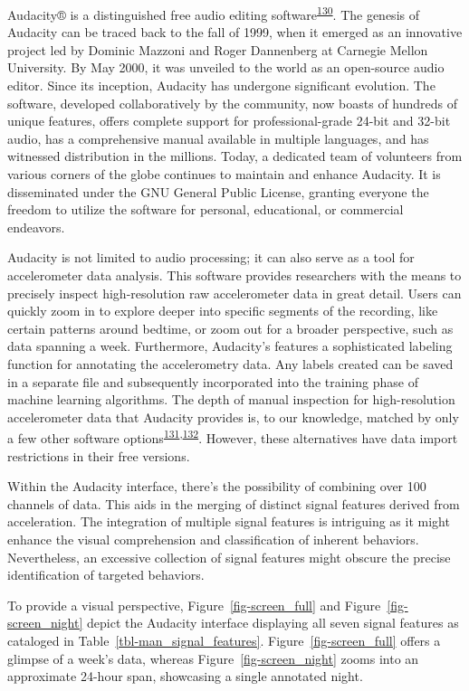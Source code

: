 \documentclass[
  10pt,
]{scrbook}
\begin{document}
Audacity®️ is a distinguished free audio editing
software\textsuperscript{\protect\hyperlink{ref-audacity}{130}}. The
genesis of Audacity can be traced back to the fall of 1999, when it
emerged as an innovative project led by Dominic Mazzoni and Roger
Dannenberg at Carnegie Mellon University. By May 2000, it was unveiled
to the world as an open-source audio editor. Since its inception,
Audacity has undergone significant evolution. The software, developed
collaboratively by the community, now boasts of hundreds of unique
features, offers complete support for professional-grade 24-bit and
32-bit audio, has a comprehensive manual available in multiple
languages, and has witnessed distribution in the millions. Today, a
dedicated team of volunteers from various corners of the globe continues
to maintain and enhance Audacity. It is disseminated under the GNU
General Public License, granting everyone the freedom to utilize the
software for personal, educational, or commercial endeavors.

Audacity is not limited to audio processing; it can also serve as a tool
for accelerometer data analysis. This software provides researchers with
the means to precisely inspect high-resolution raw accelerometer data in
great detail. Users can quickly zoom in to explore deeper into specific
segments of the recording, like certain patterns around bedtime, or zoom
out for a broader perspective, such as data spanning a week.
Furthermore, Audacity's features a sophisticated labeling function for
annotating the accelerometry data. Any labels created can be saved in a
separate file and subsequently incorporated into the training phase of
machine learning algorithms. The depth of manual inspection for
high-resolution accelerometer data that Audacity provides is, to our
knowledge, matched by only a few other software
options\textsuperscript{\protect\hyperlink{ref-visplore}{131},\protect\hyperlink{ref-label_studio}{132}}.
However, these alternatives have data import restrictions in their free
versions.

Within the Audacity interface, there's the possibility of combining over
100 channels of data. This aids in the merging of distinct signal
features derived from acceleration. The integration of multiple signal
features is intriguing as it might enhance the visual comprehension and
classification of inherent behaviors. Nevertheless, an excessive
collection of signal features might obscure the precise identification
of targeted behaviors.

To provide a visual perspective, Figure~\ref{fig-screen_full} and
Figure~\ref{fig-screen_night} depict the Audacity interface displaying
all seven signal features as cataloged in
Table~\ref{tbl-man_signal_features}. Figure~\ref{fig-screen_full} offers
a glimpse of a week's data, whereas Figure~\ref{fig-screen_night} zooms
into an approximate 24-hour span, showcasing a single annotated night.
\end{document}
